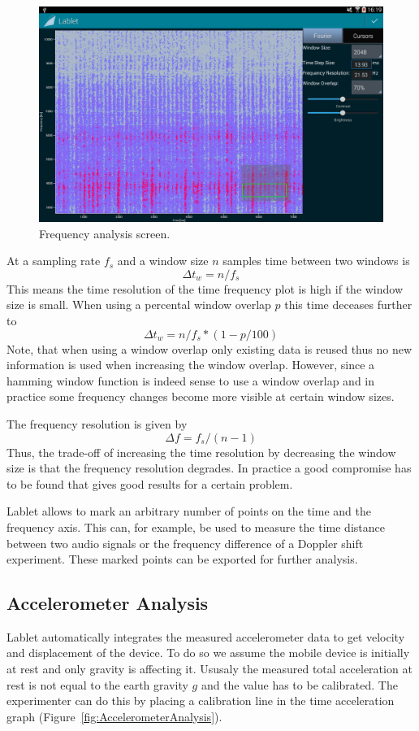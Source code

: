 \documentclass{sigchi}
\begin{document}
\begin{figure}
  \centering
  \includegraphics[width=.99\columnwidth]{FrequencyAnalysis}
  \caption{Frequency analysis screen.\label{fig:FrequencyAnalysis}}
\end{figure}

At a sampling rate $f_s$ and a window size $n$ samples time between
two windows is
\[
\Delta t_w = n / f_s
\]
This means the time resolution of the time frequency plot is high if
the window size is small.  When using a percental window overlap $p$
this time deceases further to
\[
\Delta t_w = n / f_s * (1 - p / 100)
\]
Note, that when using a window overlap only existing data is reused
thus no new information is used when increasing the window overlap.
However, since a hamming window function is indeed sense to use a
window overlap and in practice some frequency changes become more
visible at certain window sizes.

The frequency resolution is given by
\[
\Delta f = f_s / (n - 1)
\]
Thus, the trade-off of increasing the time resolution by decreasing
the window size is that the frequency resolution degrades.  In
practice a good compromise has to be found that gives good results for
a certain problem.

Lablet allows to mark an arbitrary number of points on the time and
the frequency axis.  This can, for example, be used to measure the
time distance between two audio signals or the frequency difference of
a Doppler shift experiment.  These marked points can be exported for
further analysis.

\subsection{Accelerometer Analysis}
Lablet automatically integrates the measured accelerometer data to get
velocity and displacement of the device.  To do so we assume the
mobile device is initially at rest and only gravity is affecting it.
Ususaly the measured total acceleration at rest is not equal to the
earth gravity $g$ and the value has to be calibrated.  The
experimenter can do this by placing a calibration line in the time
acceleration graph (Figure~\ref{fig:AccelerometerAnalysis}).
\end{document}
